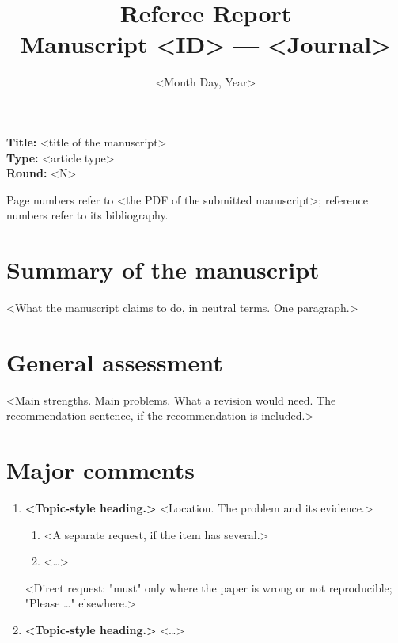 \documentclass[11pt,a4paper]{article}
\title{Referee Report\\[4pt]
  \large Manuscript <ID> --- <Journal>}
\author{}  %
\date{<Month Day, Year>}  %
\begin{document}
\maketitle

\noindent\textbf{Title:} <title of the manuscript>\\
\textbf{Type:} <article type>\\  %
\textbf{Round:} <N>

\medskip
\noindent Page numbers refer to <the PDF of the submitted manuscript>; reference numbers refer to
its bibliography.

\section*{Summary of the manuscript}

<What the manuscript claims to do, in neutral terms. One paragraph.>

\section*{General assessment}

<Main strengths. Main problems. What a revision would need. The recommendation sentence, if the
recommendation is included.>

\section*{Major comments}

\begin{enumerate}[label=\textbf{M\arabic*.}, leftmargin=*, itemsep=1.2ex]

\item \textbf{<Topic-style heading.>}
<Location. The problem and its evidence.>
\begin{enumerate}[label=(\alph*), leftmargin=*]
  \item <A separate request, if the item has several.>
  \item <…>
\end{enumerate}
<Direct request: "must" only where the paper is wrong or not reproducible; "Please …" elsewhere.>

\item \textbf{<Topic-style heading.>}
<…>

\end{enumerate}
\end{document}
